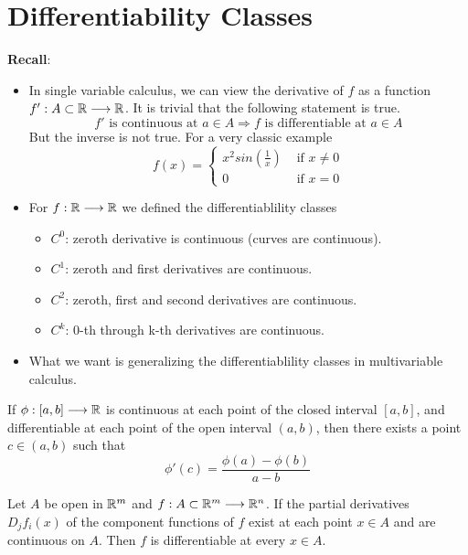\section{Differentiability Classes}

\noindent \textbf{Recall}:
\begin{itemize}
    \item In single variable calculus, we can view the derivative of $f$ as a function $f':A\subset\mathbb{R}\longrightarrow\mathbb{R}$.
    It is trivial that the following statement is true.
    $$f'\text{ is continuous at }a\in A \Longrightarrow f\text{ is differentiable at } a\in A$$
    But the inverse is not true. For a very classic example
    \begin{equation}
        f(x)=
        \begin{cases}
            x^2sin(\frac{1}{x})& \text{ if }x\neq 0\\
            0& \text{ if }x=0
        \end{cases}
    \end{equation}
    \item For $f:\mathbb{R}\longrightarrow\mathbb{R}$ we defined the differentiablility classes
    \begin{itemize}
        \item $C^0$: zeroth derivative is continuous (curves are continuous).
        \item $C^1$: zeroth and first derivatives are continuous.
        \item $C^2$: zeroth, first and second derivatives are continuous.
        \item $C^k$: 0-th through k-th derivatives are continuous.
    \end{itemize}
    \item What we want is generalizing the differentiablility classes in multivariable calculus.
\end{itemize}


\begin{lemma}\label{mvt}
    If $\phi:[a,b]\longrightarrow \mathbb{R}$ is continuous at each point of the closed interval $[a, b]$, and differentiable at each point of the open interval $(a, b)$, then there exists a point $c \in (a, b)$ such that
    $$\phi'(c)=\frac{\phi(a)-\phi(b)}{a-b}$$
\end{lemma}


\begin{theorem} \label{continuously differentiable}
    Let $A$ be open in $\mathbb{R}^m$ and $f:A\subset \mathbb{R}^m \longrightarrow \mathbb{R}^n$.
    If the partial derivatives $D_jf_i(x)$ of the component functions of $f$ exist at each point $x\in A$ and are continuous on $A$.
    Then $f$ is differentiable at every $x\in A$.
\end{theorem}


